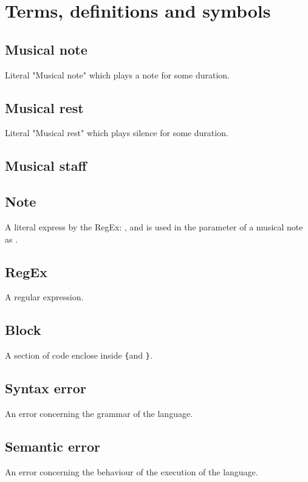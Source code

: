 \section{Terms, definitions and symbols}

\subsection{Musical note}

Literal "Musical note" which plays a note for some duration.

\subsection{Musical rest}

Literal "Musical rest" which plays silence for some duration.

\subsection{Musical staff}

\subsection{Note}

A literal express by the RegEx: \protect{}, and is used
in the parameter of a musical note as .

\subsection{RegEx}

A regular expression.

\subsection{Block}

A section of code enclose inside \verb+{+and \verb+}+.

\subsection{Syntax error}

An error concerning the grammar of the language.

\subsection{Semantic error}

An error concerning the behaviour of the execution of the language.

